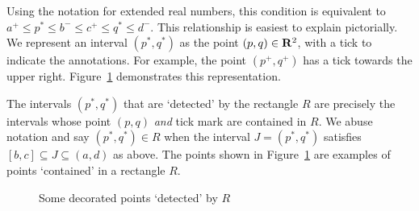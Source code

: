 Using the notation for extended real numbers, this condition is equivalent to $a^+ \leq p^* \leq b^- \leq c^+ \leq q^* \leq d^-$. This relationship is easiest to explain pictorially. We represent an interval $(p^*, q^*)$ as the point $(p, q) \in \mathbf{R}^2$, with a tick to indicate the annotations. For example, the point $(p^+, q^+)$ has a tick towards the upper right. Figure~\ref{fig:decoratedpoints} demonstrates this representation.

The intervals $(p^*, q^*)$ that are `detected' by the rectangle $R$ are precisely the intervals whose point $(p, q)$ \emph{and} tick mark are contained in $R$. We abuse notation and say $(p^*, q^*) \in R$ when the interval $J = (p^*, q^*)$ satisfies $[b, c] \subseteq J \subseteq (a, d)$ as above. The points shown in Figure~\ref{fig:decoratedpoints} are examples of points `contained' in a rectangle $R$.

\begin{figure}[!htb]
\centering
{}
\caption{Some decorated points `detected' by $R$}
\label{fig:decoratedpoints}
\end{figure}

